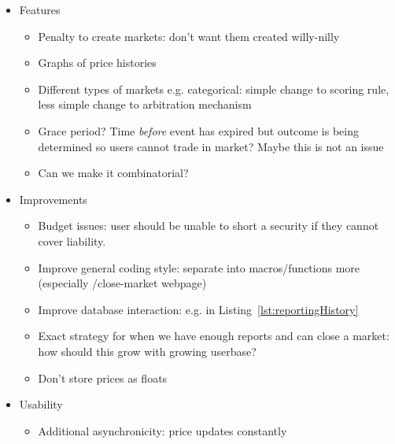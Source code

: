 \begin{itemize}
	\item Features
		\begin{itemize}
			\item Penalty to create markets: don't want them created
				willy-nilly
			\item Graphs of price histories
			\item Different types of markets e.g. categorical: simple change to scoring
				rule, less simple change to arbitration mechanism
			\item Grace period? Time \emph{before} event has expired but
				outcome is being determined so users cannot trade in market?
				Maybe this is not an issue
			\item Can we make it combinatorial?
		\end{itemize}
	\item Improvements
		\begin{itemize}
			\item Budget issues: user should be unable to short a security if
				they cannot cover liability.
			\item Improve general coding style: separate into macros/functions more
				(especially /close-market webpage)
			\item Improve database interaction: e.g. in
				Listing~\ref{lst:reportingHistory}
			\item Exact strategy for when we have enough reports and can close a
				market: how should this grow with growing userbase?
			\item Don't store prices as floats
		\end{itemize}
	\item Usability
		\begin{itemize}
			\item Additional asynchronicity: price updates constantly
		\end{itemize}
\end{itemize}

